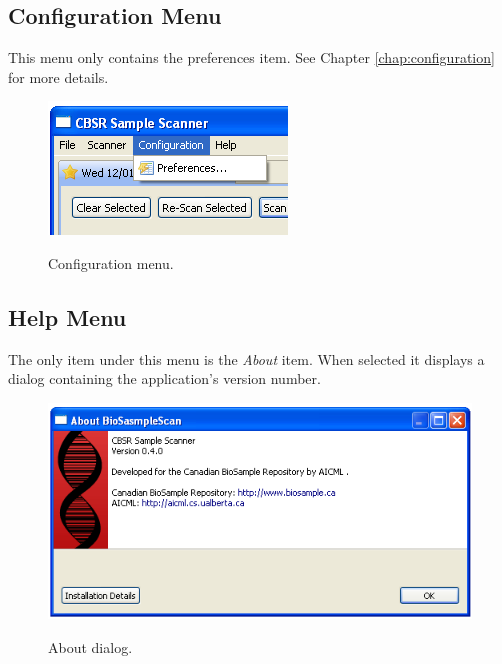 \subsection{Configuration Menu}
This menu only contains the preferences item. See Chapter
\ref{chap:configuration} for more details.
\begin{figure}[H]
  \centering
  \scalebox{0.5}
	   { \includegraphics*{screenshots/overview/configuration_menu} }
	   \caption{Configuration menu.}
	   \label{fig:configuration_menu}
\end{figure}

\subsection{Help Menu}
The only item under this menu is the \emph{About} item. When selected it
displays a dialog containing the application's version number.
\begin{figure}[H]
  \centering
  \scalebox{0.5}
	   { \includegraphics*{screenshots/overview/about_dialog} }
	   \caption{About dialog.}
	   \label{fig:about_dialog}
\end{figure}
